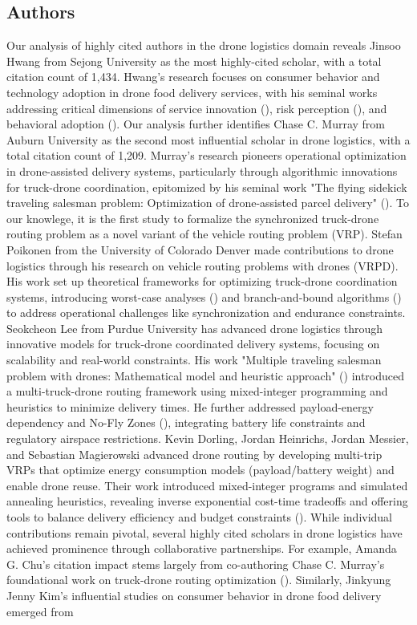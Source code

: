 \documentclass{article}
\begin{document}
\subsection{Authors}
Our analysis of highly cited authors in the drone logistics domain reveals Jinsoo Hwang from Sejong University as the most highly-cited scholar, with a total citation count of 1,434. Hwang’s research focuses on consumer behavior and technology adoption in drone food delivery services, with his seminal works addressing critical dimensions of service innovation (\cite{WOS:000478712400012}), risk perception (\cite{WOS:000495004400013}), and behavioral adoption (\cite{WOS:000605628800016}). Our analysis further identifies Chase C. Murray from Auburn University as the second most influential scholar in drone logistics, with a total citation count of 1,209. Murray’s research pioneers operational optimization in drone-assisted delivery systems, particularly through algorithmic innovations for truck-drone coordination, epitomized by his seminal work "The flying sidekick traveling salesman problem: Optimization of drone-assisted parcel delivery" (\cite{WOS:000353871700006}). To our knowlege, it is the first study to formalize the synchronized truck-drone routing problem as a novel variant of the vehicle routing problem (VRP). Stefan Poikonen from the University of Colorado Denver made contributions to drone logistics through his research on vehicle routing problems with drones (VRPD). His work set up theoretical frameworks for optimizing truck-drone coordination systems, introducing worst-case analyses (\cite{WOS:000400384200003}) and branch-and-bound algorithms (\cite{WOS:000468604000010}) to address operational challenges like synchronization and endurance constraints. Seokcheon Lee from Purdue University has advanced drone logistics through innovative models for truck-drone coordinated delivery systems, focusing on scalability and real-world constraints. His work "Multiple traveling salesman problem with drones: Mathematical model and heuristic approach" (\cite{WOS:000460496000002}) introduced a multi-truck-drone routing framework using mixed-integer programming and heuristics to minimize delivery times. He further addressed payload-energy dependency and No-Fly Zones (\cite{WOS:000474324300017}), integrating battery life constraints and regulatory airspace restrictions. Kevin Dorling, Jordan Heinrichs, Jordan Messier, and Sebastian Magierowski advanced drone routing by developing multi-trip VRPs that optimize energy consumption models (payload/battery weight) and enable drone reuse. Their work introduced mixed-integer programs and simulated annealing heuristics, revealing inverse exponential cost-time tradeoffs and offering tools to balance delivery efficiency and budget constraints (\cite{WOS:000623397300001}). While individual contributions remain pivotal, several highly cited scholars in drone logistics have achieved prominence through collaborative partnerships. For example, Amanda G. Chu's citation impact stems largely from co-authoring Chase C. Murray's foundational work on truck-drone routing optimization  (\cite{WOS:000353871700006}). Similarly, Jinkyung Jenny Kim’s influential studies on consumer behavior in drone food delivery emerged from 
\end{document}
